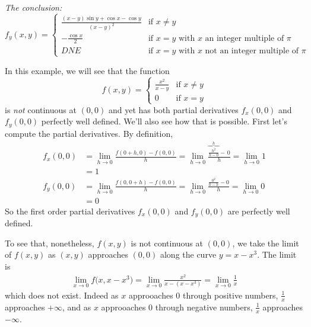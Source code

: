 \begin{eg}
\medskip
\noindent
\emph{The conclusion:\ \ \ }
\begin{equation*}
f_y(x,y)=\begin{cases}
             \frac{(x-y)\sin y
                  + \cos x-\cos y }{(x-y)^2}&\text{if $x\ne y$}\\ 
                    -\frac{\cos x}{2}&\text{if $x=y$ with $x$ an integer 
                                             multiple of $\pi$} \\
                    DNE&\text{if $x=y$ with $x$ not an integer 
                                             multiple of $\pi$}
        \end{cases}
\end{equation*}
\end{eg}
\begin{eg}\label{eg partials DDD}
In this example, we will see that the function
\begin{equation*}
f(x,y)=\begin{cases}
             \frac{x^2}{x-y}&\text{if $x\ne y$}\\ 
                    0&\text{if $x=y$}
        \end{cases}
\end{equation*}
is \emph{not} continuous at $(0,0)$ and yet has both partial derivatives 
$f_x(0,0)$ and $f_y(0,0)$ perfectly well defined. We'll also see how that is possible. First let's compute the partial derivatives. By definition,
\begin{align*}
f_x(0,0)&=\lim_{h\rightarrow 0}\frac{f(0+h,0)-f(0,0)}{h}
         =\lim_{h\rightarrow 0}\frac{\overbrace{\tfrac{h^2}{h-0}}^{h}-\,0}{h}
         =\lim_{h\rightarrow 0}1 \\
         &=1 \\
f_y(0,0)&=\lim_{h\rightarrow 0}\frac{f(0,0+h)-f(0,0)}{h}
         =\lim_{h\rightarrow 0}\frac{\frac{0^2}{0-h}-0}{h}
         =\lim_{h\rightarrow 0}0 \\
         &=0 
\end{align*}
So the first order partial derivatives $f_x(0,0)$ and $f_y(0,0)$ are perfectly well defined.

To see that, nonetheless, $f(x,y)$ is not continuous at $(0,0)$, we take the limit of $f(x,y)$ as $(x,y)$ approaches $(0,0)$ along the curve $y=x-x^3$.
The limit is
\begin{align*}
\lim_{x\rightarrow 0} f\big(x,x-x^3\big)
=\lim_{x\rightarrow 0} \frac{x^2}{x-(x-x^3)}
=\lim_{x\rightarrow 0} \frac{1}{x}
\end{align*}
which does not exist. Indeed as $x$ approoaches $0$ through positive numbers,
$\frac{1}{x}$ approaches $+\infty$, and as $x$ approoaches $0$ through negative 
numbers, $\frac{1}{x}$ approaches $-\infty$.


\end{eg}
